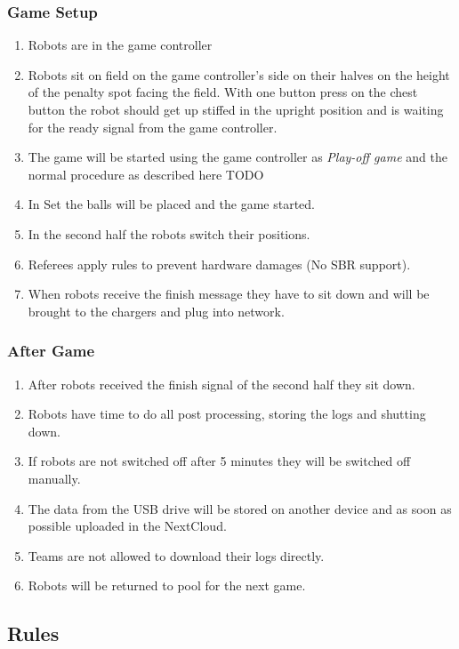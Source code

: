 \subsubsection{Game Setup}

	\begin{enumerate}
		\item Robots are in the game controller
		\item Robots sit on field on the game controller's side on their halves on the height of the penalty spot facing the field. With one button press on the chest button the robot should get up stiffed in the upright position and is waiting for the ready signal from the game controller.
		\item The game will be started using the game controller as \textit{Play-off game} and the normal procedure as described here TODO
		\item In Set the balls will be placed and the game started.
		\item In the second half the robots switch their positions.
		\item  Referees apply rules to prevent hardware damages (No SBR support).
		\item When robots receive the finish message they have to sit down and will be brought to the chargers and plug into network.
	\end{enumerate}

\subsubsection{After Game}

\begin{enumerate}
	\item After robots received the finish signal of the second half they sit down.
	\item Robots have time to do all post processing, storing the logs and shutting down.
	\item If robots are not switched off after 5 minutes they will be switched off manually.
	\item The data from the USB drive will be stored on another device and as soon as possible uploaded in the NextCloud.
	\item Teams are not allowed to download their logs directly.
	\item Robots will be returned to pool for the next game.
\end{enumerate}


\subsection{Rules}

